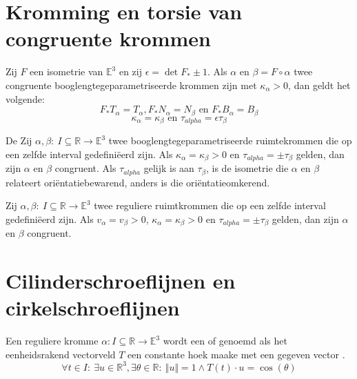 \documentclass[main.tex]{subfiles}
\begin{document}
\section{Kromming en torsie van congruente krommen}
\label{sec:kromming-en-torsie-1}

\begin{st}
  Zij $F$ een isometrie van $\mathbb{E}^{3}$ en zij $\epsilon = \det F_{*} \pm 1$.
  Als $\alpha$ en $\beta = F \circ \alpha$ twee congruente booglengtegeparametriseerde krommen zijn met $\kappa_{\alpha} > 0$, dan geldt het volgende:
  \[ F_{*}T_{\alpha} = T_{\alpha}, F_{*}N_{\alpha} = N_{\beta} \text{ en } F_{*}B_{\alpha}= B_{\beta} \]
  \[ \kappa_{\alpha} = \kappa_{\beta} \text{ en } \tau_{alpha} = \epsilon \tau_{\beta} \]
\end{st}

\begin{st}
  De 
  Zij $\alpha, \beta:\ I \subseteq \mathbb{R} \rightarrow \mathbb{E}^{3}$ twee booglengtegeparametriseerde ruimtekrommen die op een zelfde interval gedefini\"eerd zijn.
  Als $\kappa_{\alpha} = \kappa_{\beta}>0$ en $\tau_{alpha} = \pm \tau_{\beta}$ gelden, dan zijn $\alpha$ en $\beta$ congruent.
  Als $\tau_{alpha}$ gelijk is aan $\tau_{\beta}$, is de isometrie die $\alpha$ en $\beta$ relateert ori\"entatiebewarend, anders is die ori\"entatieomkerend.
\end{st}

\begin{st}
  Zij $\alpha, \beta:\ I \subseteq \mathbb{R} \rightarrow \mathbb{E}^{3}$ twee reguliere ruimtkrommen die op een  zelfde interval gedefini\"eerd zijn.
  Als $v_{\alpha} = v_{\beta} > 0$, $\kappa_{\alpha} = \kappa_{\beta}>0$ en $\tau_{alpha} = \pm \tau_{\beta}$ gelden, dan zijn $\alpha$ en $\beta$ congruent.
\end{st}

\section{Cilinderschroeflijnen en cirkelschroeflijnen}
\label{sec:cilind-en-cirk}

\begin{de}
  Een reguliere kromme $\alpha: I \subseteq \mathbb{R} \rightarrow \mathbb{E}^{3}$ wordt een  of  genoemd als het eenheidsrakend vectorveld $T$ een constante hoek maake met een gegeven vector .
  \[ \forall t \in I:\ \exists u\in \mathbb{R}^{3}, \exists \theta \in \mathbb{R}:\ \Vert u \Vert = 1 \wedge T(t) \cdot u = \cos(\theta) \]
\end{de}
\end{document}
